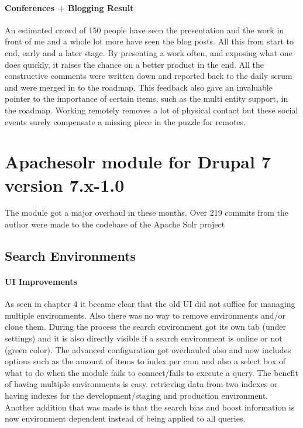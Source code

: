\paragraph{Conferences + Blogging Result}
An estimated crowd of 150 people have seen the presentation and the work in front of me and a whole lot more have seen the blog posts. All this from start to end, early and a later stage. By presenting a work often, and exposing what one does quickly, it raises the chance on a better product in the end. All the constructive comments were written down and reported back to the daily scrum and were merged in to the roadmap. This feedback also gave an invaluable pointer to the importance of certain items, such as the multi entity support, in the roadmap. Working remotely removes a lot of physical contact but these social events surely compensate a missing piece in the puzzle for remotes. 

\section{Apachesolr module for Drupal 7 version 7.x-1.0}
The module got a major overhaul in these months. Over 219 commits from the author were made to the codebase of the Apache Solr project 
\subsection{Search Environments}
\paragraph{UI Improvements}
As seen in chapter 4 it became clear that the old UI did not suffice for managing multiple environments. Also there was no way to remove environments and/or clone them. During the process the search environment got its own tab (under settings) and it is also directly visible if a search environment is online or not (green color). 
The advanced configuration got overhauled also and now includes options such as the amount of items to index per cron and also a select box of what to do when the module fails to connect/fails to execute a query. The benefit of having multiple environments is easy. retrieving data from two indexes or having indexes for the development/staging and production environment. 
Another addition that was made is that the search bias and boost information is now environment dependent instead of being applied to all queries.

